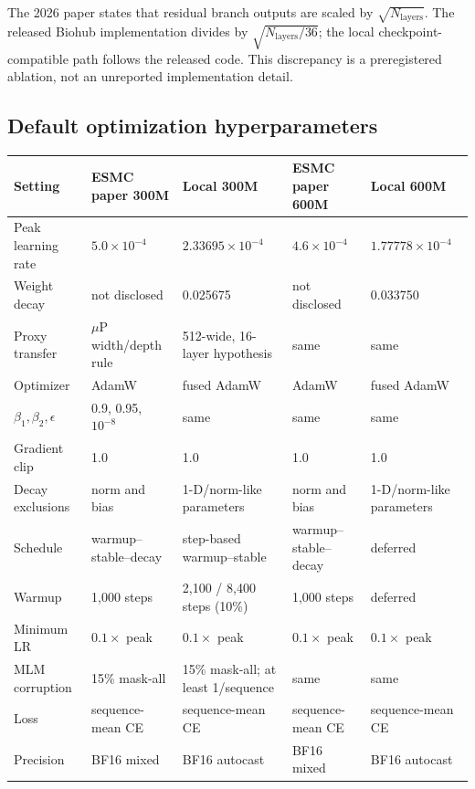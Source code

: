 \documentclass{article}
\begin{document}
The 2026 paper states that residual branch outputs are scaled by
$\sqrt{N_{\mathrm{layers}}}$. The released Biohub implementation divides by
$\sqrt{N_{\mathrm{layers}}/36}$; the local checkpoint-compatible path follows
the released code. This discrepancy is a preregistered ablation, not an
unreported implementation detail.

\subsection{Default optimization hyperparameters}

\begin{table}[H]
  \centering
  \scriptsize
  \setlength{\tabcolsep}{3.4pt}
  \begin{tabularx}{\textwidth}{@{}p{}YYYY@{}}
    \toprule
    Setting & ESMC paper 300M & Local 300M & ESMC paper 600M & Local 600M \\
    \midrule
    Peak learning rate & $5.0\!\times\!10^{-4}$ & $2.33695\!\times\!10^{-4}$ & $4.6\!\times\!10^{-4}$ & $1.77778\!\times\!10^{-4}$ \\
    Weight decay & not disclosed & 0.025675 & not disclosed & 0.033750 \\
    Proxy transfer & $\mu$P width/depth rule & 512-wide, 16-layer hypothesis & same & same \\
    Optimizer & AdamW & fused AdamW & AdamW & fused AdamW \\
    $\beta_1,\beta_2,\epsilon$ & 0.9, 0.95, $10^{-8}$ & same & same & same \\
    Gradient clip & 1.0 & 1.0 & 1.0 & 1.0 \\
    Decay exclusions & norm and bias & 1-D/norm-like parameters & norm and bias & 1-D/norm-like parameters \\
    Schedule & warmup--stable--decay & step-based warmup--stable & warmup--stable--decay & deferred \\
    Warmup & 1,000 steps & 2,100 / 8,400 steps (10\%) & 1,000 steps & deferred \\
    Minimum LR & $0.1\times$ peak & $0.1\times$ peak & $0.1\times$ peak & $0.1\times$ peak \\
    MLM corruption & 15\% mask-all & 15\% mask-all; at least 1/sequence & same & same \\
    Loss & sequence-mean CE & sequence-mean CE & sequence-mean CE & sequence-mean CE \\
    Precision & BF16 mixed & BF16 autocast & BF16 mixed & BF16 autocast \\

\end{tabularx}
\end{table}
\end{document}
